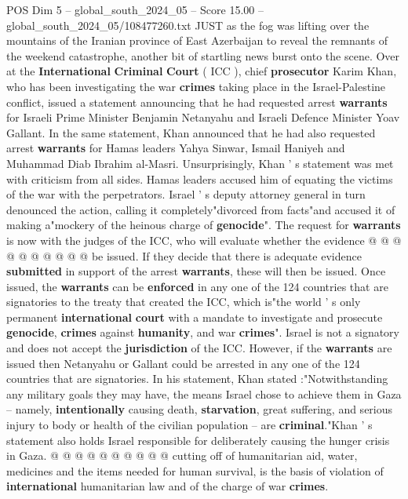 \begin{textsample}{POS Dim 5 – global\_south\_2024\_05 – Score 15.00 – global\_south\_2024\_05/108477260.txt}  \label{ex:f5_pos_128}
JUST as the fog was lifting over the mountains of the Iranian province of East Azerbaijan to reveal the remnants of the weekend catastrophe, another bit of startling news burst onto the scene.
Over at the \textbf{International} \textbf{Criminal} \textbf{Court} ( ICC ), chief \textbf{prosecutor} Karim Khan, who has been investigating the war \textbf{crimes} taking place in the Israel-Palestine conflict, issued a statement announcing that he had requested arrest \textbf{warrants} for Israeli Prime Minister Benjamin Netanyahu and Israeli Defence Minister Yoav Gallant.
In the same statement, Khan announced that he had also requested arrest \textbf{warrants} for Hamas leaders Yahya Sinwar, Ismail Haniyeh and Muhammad Diab Ibrahim al-Masri.
Unsurprisingly, Khan ' s statement was met with criticism from all sides.
Hamas leaders accused him of equating the victims of the war with the perpetrators.
Israel ' s deputy attorney general in turn denounced the action, calling it completely"divorced from facts"and accused it of making a"mockery of the heinous charge of \textbf{genocide}".
The request for \textbf{warrants} is now with the judges of the ICC, who will evaluate whether the evidence @ @ @ @ @ @ @ @ @ @ be issued.
If they decide that there is adequate evidence \textbf{submitted} in support of the arrest \textbf{warrants}, these will then be issued.
Once issued, the \textbf{warrants} can be \textbf{enforced} in any one of the 124 countries that are signatories to the treaty that created the ICC, which is"the world ' s only permanent \textbf{international} \textbf{court} with a mandate to investigate and prosecute \textbf{genocide}, \textbf{crimes} against \textbf{humanity}, and war \textbf{crimes}".
Israel is not a signatory and does not accept the \textbf{jurisdiction} of the ICC.
However, if the \textbf{warrants} are issued then Netanyahu or Gallant could be arrested in any one of the 124 countries that are signatories.
In his statement, Khan stated :"Notwithstanding any military goals they may have, the means Israel chose to achieve them in Gaza -- namely, \textbf{intentionally} causing death, \textbf{starvation}, great suffering, and serious injury to body or health of the civilian population -- are \textbf{criminal}."Khan ' s statement also holds Israel responsible for deliberately causing the hunger crisis in Gaza. @ @ @ @ @ @ @ @ @ @ cutting off of humanitarian aid, water, medicines and the items needed for human survival, is the basis of violation of \textbf{international} humanitarian law and of the charge of war \textbf{crimes}.

\end{textsample}
